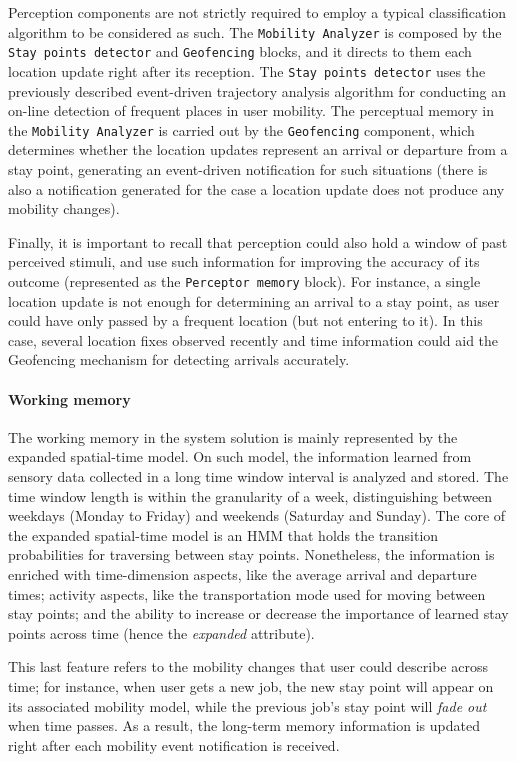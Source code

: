 \documentclass[ENG,PhD]{cinvestav}
\begin{document}
Perception components are not strictly required to employ a typical classification algorithm to be considered as such.
The \texttt{Mobility Analyzer} is composed by the \texttt{Stay points detector} and \texttt{Geofencing} blocks, and it directs to them each location update right after its reception.
The \texttt{Stay points detector} uses the previously described event-driven trajectory analysis algorithm for conducting an on-line detection of frequent places in user mobility.
The perceptual memory in the \texttt{Mobility Analyzer} is carried out by the \texttt{Geofencing} component, which determines whether the location updates represent an arrival or departure from a stay point, generating an event-driven notification for such situations (there is also a notification generated for the case a location update does not produce any mobility changes).

Finally, it is important to recall that perception could also hold a window of past perceived stimuli, and use such information for improving the accuracy of its outcome (represented as the \texttt{Perceptor memory} block).
For instance, a single location update is not enough for determining an arrival to a stay point, as user could have only passed by a frequent location (but not entering to it).
In this case, several location fixes observed recently and time information could aid the Geofencing mechanism for detecting arrivals accurately.


\paragraph*{Working memory}
The working memory in the system solution is mainly represented by the expanded spatial-time model.
On such model, the information learned from sensory data collected in a long time window interval is analyzed and stored.
The time window length is within the granularity of a week, distinguishing between weekdays (Monday to Friday) and weekends (Saturday and Sunday).
The core of the expanded spatial-time model is an HMM that holds the transition probabilities for traversing between stay points.
Nonetheless, the information is enriched with time-dimension aspects, like the average arrival and departure times; activity aspects, like the transportation mode used for moving between stay points; and the ability to increase or decrease the importance of learned stay points across time (hence the \emph{expanded} attribute). 

This last feature refers to the mobility changes that user could describe across time; for instance, when user gets a new job, the new stay point will appear on its associated mobility model, while the previous job's stay point will \emph{fade out} when time passes.
As a result, the long-term memory information is updated right after each mobility event notification is received.
\end{document}
